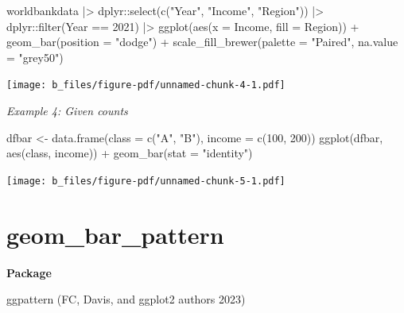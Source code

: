 \documentclass[
  letterpaper,
  DIV=11,
  numbers=noendperiod]{scrreprt}
\newenvironment{Shaded}{\begin{snugshade}}{\end{snugshade}}
\newcommand{\AttributeTok}[1]{\textcolor[rgb]{0.40,0.45,0.13}{#1}}
\newcommand{\DecValTok}[1]{\textcolor[rgb]{0.68,0.00,0.00}{#1}}
\newcommand{\FunctionTok}[1]{\textcolor[rgb]{0.28,0.35,0.67}{#1}}
\newcommand{\NormalTok}[1]{\textcolor[rgb]{0.00,0.23,0.31}{#1}}
\newcommand{\OtherTok}[1]{\textcolor[rgb]{0.00,0.23,0.31}{#1}}
\newcommand{\SpecialCharTok}[1]{\textcolor[rgb]{0.37,0.37,0.37}{#1}}
\newcommand{\StringTok}[1]{\textcolor[rgb]{0.13,0.47,0.30}{#1}}
\begin{document}
\begin{Shaded}
\begin{Highlighting}[]
\NormalTok{worldbankdata }\SpecialCharTok{|\textgreater{}}
\NormalTok{  dplyr}\SpecialCharTok{::}\FunctionTok{select}\NormalTok{(}\FunctionTok{c}\NormalTok{(}\StringTok{"Year"}\NormalTok{, }\StringTok{"Income"}\NormalTok{, }\StringTok{"Region"}\NormalTok{)) }\SpecialCharTok{|\textgreater{}}
\NormalTok{  dplyr}\SpecialCharTok{::}\FunctionTok{filter}\NormalTok{(Year }\SpecialCharTok{==} \DecValTok{2021}\NormalTok{) }\SpecialCharTok{|\textgreater{}}
  \FunctionTok{ggplot}\NormalTok{(}\FunctionTok{aes}\NormalTok{(}\AttributeTok{x =}\NormalTok{ Income, }\AttributeTok{fill =}\NormalTok{ Region)) }\SpecialCharTok{+}
  \FunctionTok{geom\_bar}\NormalTok{(}\AttributeTok{position =} \StringTok{"dodge"}\NormalTok{) }\SpecialCharTok{+}
  \FunctionTok{scale\_fill\_brewer}\NormalTok{(}\AttributeTok{palette =} \StringTok{"Paired"}\NormalTok{, }\AttributeTok{na.value =} \StringTok{"grey50"}\NormalTok{)}
\end{Highlighting}
\end{Shaded}

\texttt{[image: b\_files/figure-pdf/unnamed-chunk-4-1.pdf]}

\emph{Example 4: Given counts}

\begin{Shaded}
\begin{Highlighting}[]
\NormalTok{dfbar }\OtherTok{\textless{}{-}} \FunctionTok{data.frame}\NormalTok{(}\AttributeTok{class =} \FunctionTok{c}\NormalTok{(}\StringTok{"A"}\NormalTok{, }\StringTok{"B"}\NormalTok{), }\AttributeTok{income =} \FunctionTok{c}\NormalTok{(}\DecValTok{100}\NormalTok{, }\DecValTok{200}\NormalTok{))}
\FunctionTok{ggplot}\NormalTok{(dfbar, }\FunctionTok{aes}\NormalTok{(class, income)) }\SpecialCharTok{+}
  \FunctionTok{geom\_bar}\NormalTok{(}\AttributeTok{stat =} \StringTok{"identity"}\NormalTok{)}
\end{Highlighting}
\end{Shaded}

\texttt{[image: b\_files/figure-pdf/unnamed-chunk-5-1.pdf]}

\section{geom\_bar\_pattern}\label{bar_pattern}

\textbf{Package}

ggpattern (FC, Davis, and ggplot2 authors 2023)
\end{document}
